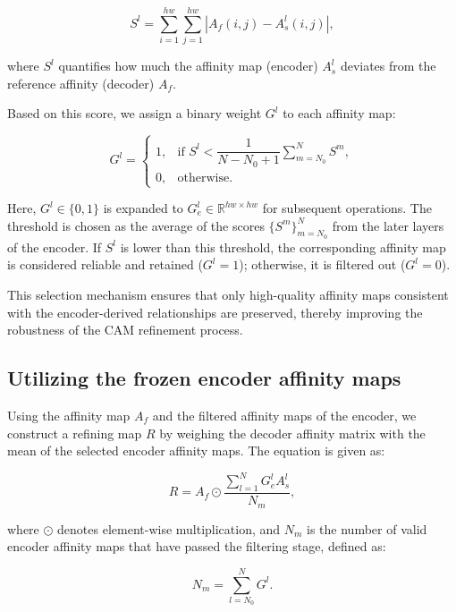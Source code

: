 \begin{equation}
    S^l = \sum_{i=1}^{hw} \sum_{j=1}^{hw} \left| A_f(i, j) - A_s^l(i, j) \right|,
\end{equation}

where $S^l$ quantifies how much the affinity map (encoder) $A_s^l$ deviates from the reference affinity (decoder) $A_f$.  

Based on this score, we assign a binary weight $G^l$ to each affinity map:  

\begin{equation}
    G^l =
    \begin{cases}
        1, & \text{if } S^l < \dfrac{1}{N - N_0 + 1} \sum_{m=N_0}^N S^m, \\[8pt]
        0, & \text{otherwise}.
    \end{cases}
\end{equation}

Here, $G^l \in \{0,1\}$ is expanded to $G^l_e \in \mathbb{R}^{hw \times hw}$ for subsequent operations. The threshold is chosen as the average of the scores $\{S^m\}_{m=N_0}^N$ from the later layers of the encoder. If $S^l$ is lower than this threshold, the corresponding affinity map is considered reliable and retained ($G^l = 1$); otherwise, it is filtered out ($G^l = 0$).  

This selection mechanism ensures that only high-quality affinity maps consistent with the encoder-derived relationships are preserved, thereby improving the robustness of the CAM refinement process.  

\subsection{Utilizing the frozen encoder affinity maps}
\label{subsec: mul_attn_and_aff}
Using the affinity map $A_f$ and the filtered affinity maps of the encoder, we construct a refining map $R$ by weighing the decoder affinity matrix with the mean of the selected encoder affinity maps. The equation is given as:

\begin{equation}
    R = A_f \odot \frac{ \sum_{l=1}^N G^l_e A_s^l}{N_m},
\end{equation}

where $\odot$ denotes element-wise multiplication, and $N_m$ is the number of valid encoder affinity maps that have passed the filtering stage, defined as:

\begin{equation}
    N_m = \sum_{l = N_0}^N G^l.
\end{equation}

